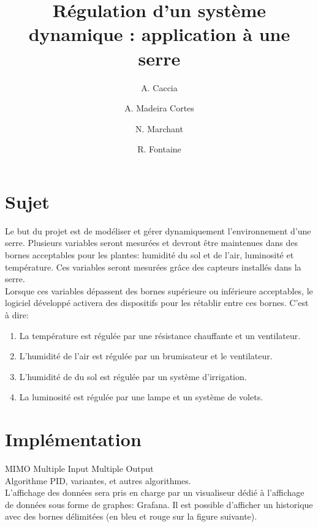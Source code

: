 \documentclass[a4paper,10pt]{article}
\title{Régulation d'un système dynamique : application à une serre}
\author{A. Caccia \and A. Madeira Cortes \and N. Marchant \and R. Fontaine}
\date{ }
\begin{document}
\maketitle

\vspace{1cm}

\section{Sujet}

Le but du projet est de modéliser et gérer dynamiquement l'environnement d'une serre. Plusieurs variables seront mesurées et devront être maintenues dans des bornes acceptables pour les plantes: humidité du sol et de l'air, luminosité et température. Ces variables seront mesurées grâce des capteurs installés dans la serre. \\

Lorsque ces variables dépassent des bornes supérieure ou inférieure acceptables, le logiciel développé activera des dispositifs pour les rétablir entre ces bornes. C'est à dire: \\

\begin{enumerate}
	\item La température est régulée par une résistance chauffante et un ventilateur.
	\item L'humidité de l'air est régulée par un brumisateur et le ventilateur.
	\item L'humidité de du sol est régulée par un système d'irrigation.
	\item La luminosité est régulée par une lampe et un système de volets.\\
\end{enumerate}

\newpage

\section{Implémentation}

MIMO Multiple Input Multiple Output \\

Algorithme PID, variantes, et autres algorithmes.\\

L'affichage des données sera pris en charge par un visualiseur dédié à l'affichage de données sous forme de graphes: Grafana. Il est possible d'afficher un historique avec des bornes délimitées (en bleu et rouge sur la figure suivante). \\
\end{document}

